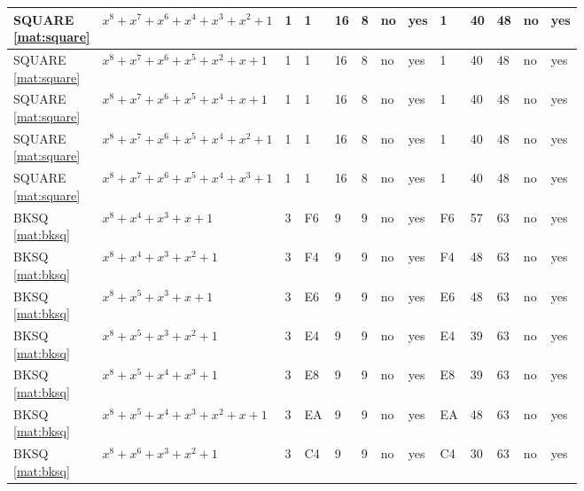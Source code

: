 \begin{tiny}
\begin{longtable}{|l|l|l|l|l|l|l|l|l|l|l|l|l|}
\shortstack{SQUARE \\ \eqref{mat:square}} & $x^8 + x^7 + x^6 + x^4 + x^3 + x^2 + 1$ & 1 & 1 & 16 & 8 & no & yes & 1 & 40 & 48 & no & yes \\ \hline
\shortstack{SQUARE \\ \eqref{mat:square}} & $x^8 + x^7 + x^6 + x^5 + x^2 + x + 1$ & 1 & 1 & 16 & 8 & no & yes & 1 & 40 & 48 & no & yes \\ \hline
\shortstack{SQUARE \\ \eqref{mat:square}} & $x^8 + x^7 + x^6 + x^5 + x^4 + x + 1$ & 1 & 1 & 16 & 8 & no & yes & 1 & 40 & 48 & no & yes \\ \hline
\shortstack{SQUARE \\ \eqref{mat:square}} & $x^8 + x^7 + x^6 + x^5 + x^4 + x^2 + 1$ & 1 & 1 & 16 & 8 & no & yes & 1 & 40 & 48 & no & yes \\ \hline
\shortstack{SQUARE \\ \eqref{mat:square}} & $x^8 + x^7 + x^6 + x^5 + x^4 + x^3 + 1$ & 1 & 1 & 16 & 8 & no & yes & 1 & 40 & 48 & no & yes \\ \hline
\shortstack{BKSQ \\ \eqref{mat:bksq}} & $x^8 + x^4 + x^3 + x + 1$ & 3 & F6 & 9 & 9 & no & yes & F6 & 57 & 63 & no & yes \\ \hline
\shortstack{BKSQ \\ \eqref{mat:bksq}} & $x^8 + x^4 + x^3 + x^2 + 1$ & 3 & F4 & 9 & 9 & no & yes & F4 & 48 & 63 & no & yes \\ \hline
\shortstack{BKSQ \\ \eqref{mat:bksq}} & $x^8 + x^5 + x^3 + x + 1$ & 3 & E6 & 9 & 9 & no & yes & E6 & 48 & 63 & no & yes \\ \hline
\shortstack{BKSQ \\ \eqref{mat:bksq}} & $x^8 + x^5 + x^3 + x^2 + 1$ & 3 & E4 & 9 & 9 & no & yes & E4 & 39 & 63 & no & yes \\ \hline
\shortstack{BKSQ \\ \eqref{mat:bksq}} & $x^8 + x^5 + x^4 + x^3 + 1$ & 3 & E8 & 9 & 9 & no & yes & E8 & 39 & 63 & no & yes \\ \hline
\shortstack{BKSQ \\ \eqref{mat:bksq}} & $x^8 + x^5 + x^4 + x^3 + x^2 + x + 1$ & 3 & EA & 9 & 9 & no & yes & EA & 48 & 63 & no & yes \\ \hline
\shortstack{BKSQ \\ \eqref{mat:bksq}} & $x^8 + x^6 + x^3 + x^2 + 1$ & 3 & C4 & 9 & 9 & no & yes & C4 & 30 & 63 & no & yes \\ \hline

\end{longtable}
\end{tiny}
